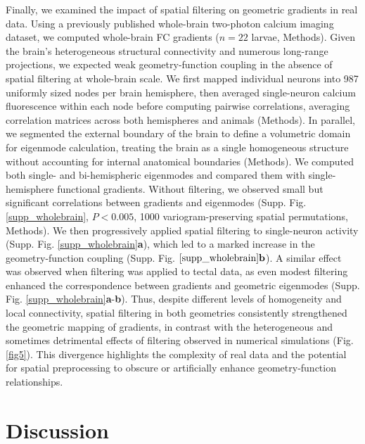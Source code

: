 \documentclass{article}
\begin{document}
Finally, we examined the impact of spatial filtering on geometric gradients in real data. Using a previously published whole-brain two-photon calcium imaging dataset\cite{legare2024structural}, we computed whole-brain FC gradients ($n=22$ larvae, Methods). Given the brain's heterogeneous structural connectivity and numerous long-range projections, we expected weak geometry-function coupling in the absence of spatial filtering at whole-brain scale. We first mapped individual neurons into 987 uniformly sized nodes per brain hemisphere, then averaged single-neuron calcium fluorescence within each node before computing pairwise correlations, averaging correlation matrices across both hemispheres and animals (Methods). In parallel, we segmented the external boundary of the brain to define a volumetric domain for eigenmode calculation, treating the brain as a single homogeneous structure without accounting for internal anatomical boundaries (Methods). We computed both single- and bi-hemispheric eigenmodes and compared them with single-hemisphere functional gradients. Without filtering, we observed small but significant correlations between gradients and eigenmodes (Supp. Fig. \ref{supp_wholebrain}, $P<0.005$, 1000 variogram-preserving spatial permutations, Methods). We then progressively applied spatial filtering to single-neuron activity (Supp. Fig. \ref{supp_wholebrain}\textbf{a}), which led to a marked increase in the geometry-function coupling (Supp. Fig. $\ref{supp_wholebrain}\textbf{b}$). A similar effect was observed when filtering was applied to tectal data, as even modest filtering enhanced the correspondence between gradients and geometric eigenmodes (Supp. Fig. \ref{supp_wholebrain}\textbf{a}-\textbf{b}). Thus, despite different levels of homogeneity and local connectivity, spatial filtering in both geometries consistently strengthened the geometric mapping of gradients, in contrast with the heterogeneous and sometimes detrimental effects of filtering observed in numerical simulations (Fig. \ref{fig5}). This divergence highlights the complexity of real data and the potential for spatial preprocessing to obscure or artificially enhance geometry-function relationships.

\section*{Discussion}

\end{document}
